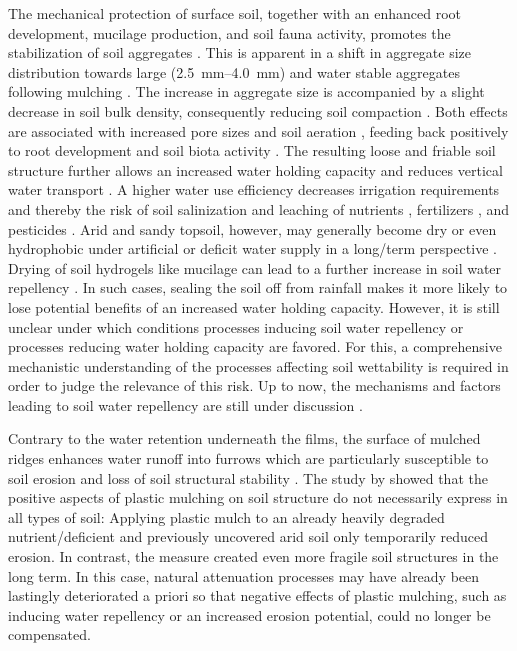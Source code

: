 The mechanical protection of surface soil, together with an enhanced root development, mucilage production, and soil fauna activity, promotes the stabilization of soil aggregates \citep{SixHistory2004}. This is apparent in a shift in aggregate size distribution towards large (\SIrange{2.5}{4.0}{\milli\meter}) and water stable aggregates following mulching \citep{Domagala-SwiatkiewiczEffect2013,ZhangRunoff2013}. The increase in aggregate size is accompanied by a slight decrease in soil bulk density, consequently reducing soil compaction \citep{MbahPhysical2010,TindallMulch1991}. Both effects are associated with increased pore sizes and soil aeration \citep{KhanSoil2000}, feeding back positively to root development and soil biota activity \citep{SchonbeckEffects1998a}. The resulting loose and friable soil structure further allows an increased water holding capacity \citep{Domagala-SwiatkiewiczEffect2013,MbahPhysical2010} and reduces vertical water transport \citep{PeeyushEffect2008}. A higher water use efficiency decreases irrigation requirements and thereby the risk of soil salinization \citep{DongFurrow2008} and leaching of nutrients \citep{KimSimulation2014}, fertilizers \citep{HaraguchiEffect2004}, and pesticides \citep{LeibDrip2000}. Arid and sandy topsoil, however, may generally become dry or even hydrophobic under artificial or deficit water supply in a long\-/term perspective \citep{JaramilloOccurrence2000, RobinsonComparison1999}. Drying of soil hydrogels like mucilage can lead to a further increase in soil water repellency \citep{AhmedDrying2016,CarminatiRhizosphere2013}. In such cases, sealing the soil off from rainfall makes it more likely to lose potential benefits of an increased water holding capacity. However, it is still unclear under which conditions processes inducing soil water repellency or processes reducing water holding capacity are favored. For this, a comprehensive mechanistic understanding of the processes affecting soil wettability is required in order to judge the relevance of this risk. Up to now, the mechanisms and factors leading to soil water repellency are still under discussion \citep{DiehlSoil2013}.

Contrary to the water retention underneath the films, the surface of mulched ridges enhances water runoff into furrows which are particularly susceptible to soil erosion and loss of soil structural stability \citep{RiceRunoff2001,WanRunoff1999,ZhangRunoff2013}. The study by \citet{RooseOrganic2001} showed that the positive aspects of plastic mulching on soil structure do not necessarily express in all types of soil: Applying plastic mulch to an already heavily degraded nutrient\-/deficient and previously uncovered arid soil only temporarily reduced erosion. In contrast, the measure created even more fragile soil structures in the long term. In this case, natural attenuation processes may have already been lastingly deteriorated a priori so that negative effects of plastic mulching, such as inducing water repellency or an increased erosion potential, could no longer be compensated.

